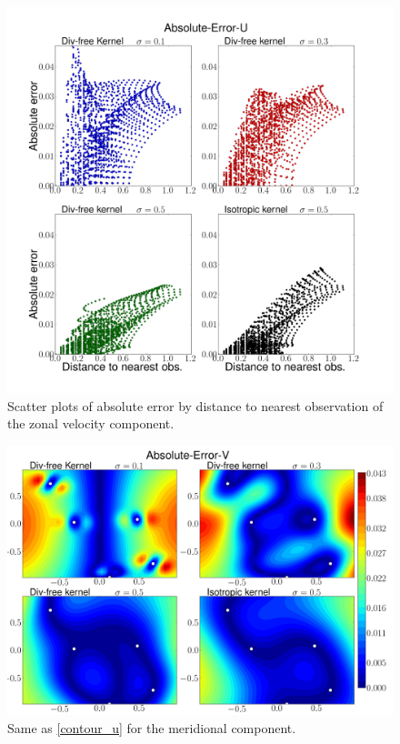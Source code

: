 \documentclass[12pt,a4paper]{article}%
\begin{document}
\begin{figure}
\noindent\includegraphics[width=36pc]{plots/Absolute-Error-U-scatter.png}
\caption{Scatter plots of absolute error by distance to nearest observation of 
the zonal velocity component.}
\label{scatter_u}
\end{figure}


\begin{figure}
\noindent\includegraphics[width=36pc]{plots/Absolute-Error-V-contour.png}
\caption{Same as \ref{contour_u} for the meridional component.  }
\label{contour_v}
\end{figure}
\end{document}
